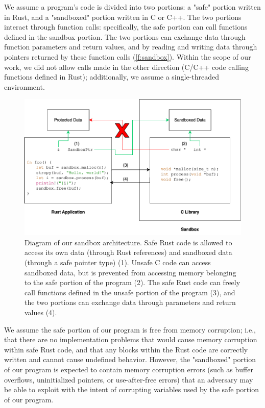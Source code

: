 We assume a program's code is divided into two portions: a "safe" portion written in Rust, and a
"sandboxed" portion written in C or C++. The two portions interact through function calls:
specifically, the safe portion can call functions defined in the sandbox portion. The two portions
can exchange data through function parameters and return values, and by reading and writing data
through pointers returned by these function calls (\autoref{f:sandbox}). Within the scope of our
work, we did not allow calls made in the other direction (C/C++ code calling functions defined in
Rust); additionally, we assume a single-threaded environment.

\begin{figure}[!ht]
    \includegraphics[width=\textwidth]{fig/sandbox}
    \caption[Diagram of our sandbox architecture]{Diagram of our sandbox architecture. Safe Rust
    code is allowed to access its own data (through Rust references) and sandboxed data (through a
     safe pointer type) (1). Unsafe C code can access sandboxed data, but is
    prevented from accessing memory belonging to the safe portion of the program (2). The safe Rust
    code can freely call functions defined in the unsafe portion of the program (3), and the two
    portions can exchange data through parameters and return values (4).}
    \label{f:sandbox}
\end{figure}

We assume the safe portion of our program is free from memory corruption; i.e., that there are no
implementation problems that would cause memory corruption within safe Rust code, and that any
 blocks within the Rust code are correctly written and cannot cause undefined behavior.
However, the "sandboxed" portion of our program is expected to contain memory corruption errors
(such as buffer overflows, uninitialized pointers, or use-after-free errors) that an adversary may
be able to exploit with the intent of corrupting variables used by the safe portion of our program.

